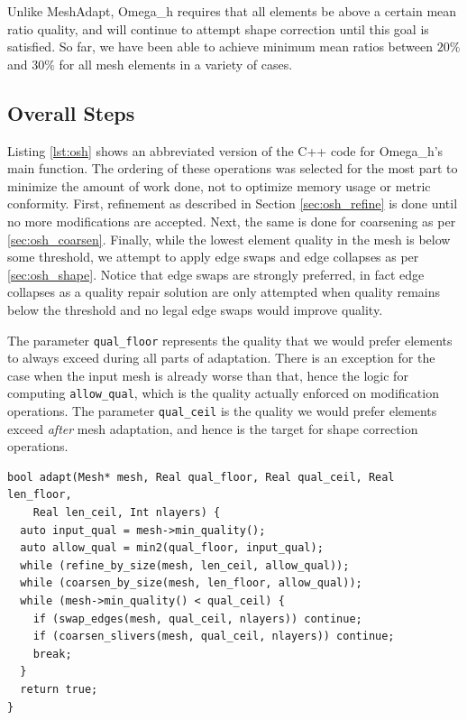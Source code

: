 Unlike MeshAdapt, Omega\_h requires that all elements be above a certain
mean ratio quality, and will continue to attempt shape correction until
this goal is satisfied.
So far, we have been able to achieve minimum mean ratios between $20\%$
and $30\%$ for all mesh elements in a variety of cases.

\subsection{Overall Steps}
\label{sec:osh}

Listing \ref{lst:osh} shows an abbreviated version of the C++ code for
Omega\_h's main function.
The ordering of these operations was selected for the most part to minimize
the amount of work done, not to optimize memory usage or metric conformity.
First, refinement as described in Section \ref{sec:osh_refine} is done
until no more modifications are accepted.
Next, the same is done for coarsening as per \ref{sec:osh_coarsen}.
Finally, while the lowest element quality in the mesh is below some
threshold, we attempt to apply edge swaps and edge collapses as
per \ref{sec:osh_shape}.
Notice that edge swaps are strongly preferred, in fact edge
collapses as a quality repair solution are only attempted when
quality remains below the threshold and no legal edge swaps
would improve quality.

The parameter \texttt{qual\_floor} represents the quality that
we would prefer elements to always exceed during all parts of
adaptation.
There is an exception for the case when the input mesh is
already worse than that, hence the logic for computing
\texttt{allow\_qual}, which is the quality actually enforced
on modification operations.
The parameter \texttt{qual\_ceil} is the quality we would prefer
elements exceed \emph{after} mesh adaptation, and hence is the
target for shape correction operations.

\begin{lstlisting}[float,style=dan-style,caption=Omega\_h main function,label=lst:osh]
bool adapt(Mesh* mesh, Real qual_floor, Real qual_ceil, Real len_floor,
    Real len_ceil, Int nlayers) {
  auto input_qual = mesh->min_quality();
  auto allow_qual = min2(qual_floor, input_qual);
  while (refine_by_size(mesh, len_ceil, allow_qual));
  while (coarsen_by_size(mesh, len_floor, allow_qual));
  while (mesh->min_quality() < qual_ceil) {
    if (swap_edges(mesh, qual_ceil, nlayers)) continue;
    if (coarsen_slivers(mesh, qual_ceil, nlayers)) continue;
    break;
  }
  return true;
}
\end{lstlisting}

